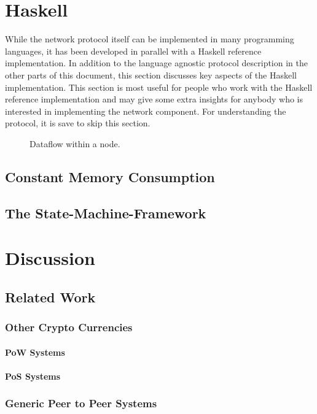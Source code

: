 \documentclass{report}
\newcommand{\wip}[1]{\color{magenta}{#1}\color{black}}
\theoremstyle{definition}{
  \newtheorem{lemma}{Lemma}[section] %
  \newtheorem{definition}[lemma]{Definition}
}
\theoremstyle{theorem}{
  \newtheorem{invariant}[lemma]{Invariant}
  \newtheorem{proofobligation}[lemma]{Proof Obligation}
}
\numberwithin{equation}{lemma}
\begin{document}
\chapter{Haskell}
While the network protocol itself can be implemented in many programming languages,
it has been developed in parallel with a Haskell reference implementation.
In addition to the language agnostic protocol description in the other parts of this document,
this section discusses key aspects of the Haskell implementation.
This section is most useful for people who work with the Haskell reference implementation and
may give some extra insights for anybody who is interested in implementing the
network component.
For understanding the protocol, it is save to skip this section.
\begin{figure}
\begin{center}
\end{center}
\caption{Dataflow within a node.}
\label{node-diagram-concurency}
\end{figure}
\section{Constant Memory Consumption}
\section{The State-Machine-Framework}
\label{Haskell-state-machine}

\chapter{Discussion}
\section{Related Work}
\subsection{Other Crypto Currencies}
\subsubsection{PoW Systems}
\subsubsection{PoS Systems}
\subsection{Generic Peer to Peer Systems}
\wip{WIP: Poldercast,etc}
\end{document}
